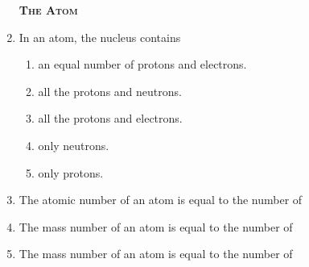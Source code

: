\documentclass[main.tex]{subfiles}
\begin{document}
\begin{multicols*}{2}
\begin{enumerate}
{\raggedright\textsc{\textbf{The Atom }}\par}

\item In an atom, the nucleus contains 
\begin{enumerate}[label=(\alph*)]
\item an equal number of protons and electrons.
\item all the protons and neutrons.
\item all the protons and electrons.
\item only neutrons.
\item only protons.
\end{enumerate}

\item The atomic number of an atom is equal to the number of  
\begin{enumerate}[label=(\alph*)]
\end{enumerate}

\item The mass number of an atom is equal to the number of  
\begin{enumerate}[label=(\alph*)]
\end{enumerate}



\item The mass number of an atom is equal to the number of  
\begin{enumerate}[label=(\alph*)]
\end{enumerate}




\end{enumerate}
\end{multicols*}
\end{document}
